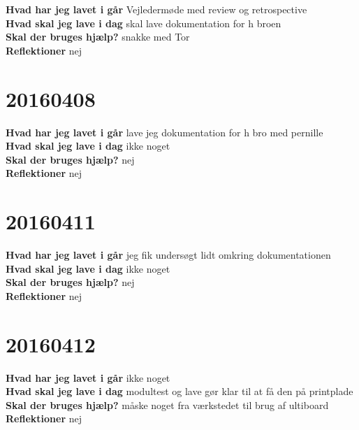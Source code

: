 \documentclass{article}
\begin{document}
						\textbf{Hvad har jeg lavet i går}
						Vejledermøde med review og retrospective
						\\
						\textbf{Hvad skal jeg lave i dag}
						skal lave dokumentation for h broen
						\\
						\textbf{Skal der bruges hjælp?}
						snakke med Tor
						\\
						\textbf{Reflektioner}
						nej	
						
	\section{20160408}
	
	\textbf{Hvad har jeg lavet i går}
	lave jeg dokumentation for h bro med pernille
	\\
	\textbf{Hvad skal jeg lave i dag}
	ikke noget
	\\
	\textbf{Skal der bruges hjælp?}
	nej
	\\
	\textbf{Reflektioner}
	nej	
		
		
		\section{20160411}
		
		\textbf{Hvad har jeg lavet i går}
		jeg fik undersøgt lidt omkring dokumentationen
		\\
		\textbf{Hvad skal jeg lave i dag}
		ikke noget
		\\
		\textbf{Skal der bruges hjælp?}
		nej
		\\
		\textbf{Reflektioner}
		nej		
		
			\section{20160412}
			
			\textbf{Hvad har jeg lavet i går}
			ikke noget
			\\
			\textbf{Hvad skal jeg lave i dag}
			modultest og lave gør klar til at få den på printplade
			\\
			\textbf{Skal der bruges hjælp?}
			måske noget fra værkstedet til brug af ultiboard
			\\
			\textbf{Reflektioner}
			nej					
\end{document}
